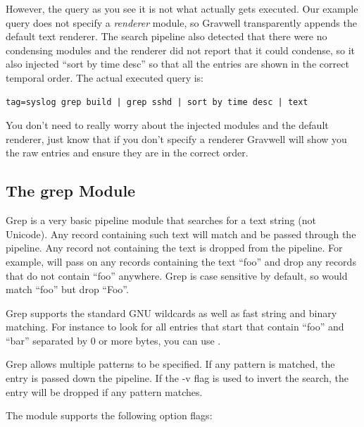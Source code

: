 However, the query as you see it is not what actually gets executed.
Our example query does not specify a \emph{renderer} module, so Gravwell
transparently appends the default text renderer. The search pipeline
also detected that there were no condensing modules and the renderer did
not report that it could condense, so it also injected ``sort by time
desc'' so that all the entries are shown in the correct temporal order.
The actual executed query is:

\begin{Verbatim}[breaklines=true]
tag=syslog grep build | grep sshd | sort by time desc | text
\end{Verbatim}

You don't need to really worry about the injected modules and the
default renderer, just know that if you don't specify a renderer
Gravwell will show you the raw entries and ensure they are in the
correct order.

\subsection{The grep Module}
\label{sec:grep}
Grep is a very basic pipeline module that searches for a text string (not Unicode). Any record containing such text will match and be passed through the pipeline. Any record not containing the text is dropped from the pipeline. For example,  will pass on any records containing the text ``foo'' and drop any records that do not contain ``foo'' anywhere. Grep is case sensitive by default, so  would match ``foo'' but drop ``Foo''.

Grep supports the standard GNU wildcards as well as fast string and binary matching. For instance to look for all entries that start that contain ``foo'' and ``bar'' separated by 0 or more bytes, you can use .

Grep allows multiple patterns to be specified. If any pattern is matched, the entry is passed down the pipeline. If the -v flag is used to invert the search, the entry will be dropped if any pattern matches.

The module supports the following option flags:

